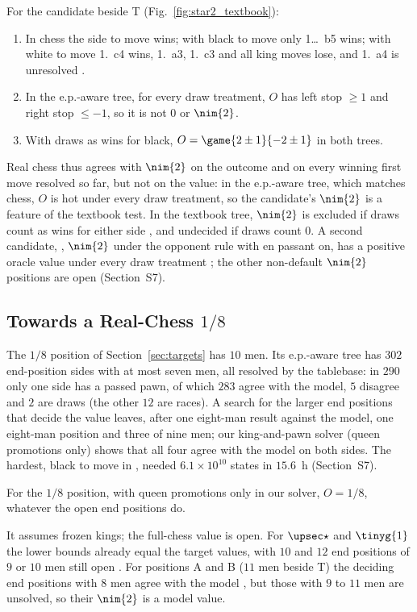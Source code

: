 \begin{theorem}\label{thm:oracle-cand}
For the candidate  beside T (Fig.~\ref{fig:star2_textbook}):
\begin{enumerate}
\item[(a)] In chess the side to move wins; with black to move only 1\ldots~b5 wins; with white to
  move 1.~c4 wins, 1.~a3, 1.~c3 and all king moves lose, and 1.~a4 is unresolved .
\item[(b)] In the e.p.-aware tree, for every draw treatment, $O$ has left stop $\ge1$ and right stop $\le-1$, so
  it is not $0$ or $\nim{2}$.
\item[(c)] With draws as wins for black, $O=\game{2\pm1}{-2\pm1}$ in both trees.
\end{enumerate}
\end{theorem}

Real chess thus agrees with $\nim{2}$ on the outcome and on every winning first move resolved so far, but not on
the value: in the e.p.-aware tree, which matches chess, $O$ is hot under every draw treatment, so the candidate's
$\nim{2}$ is a feature of the textbook test. In the textbook tree, $\nim{2}$ is excluded
if draws count as wins for either side , and undecided if draws count $0$. A second candidate, ,
$\nim{2}$ under the opponent rule with en passant on, has a positive oracle value under every draw treatment
; the other non-default $\nim{2}$ positions are open (Section~S7).

\subsection{Towards a Real-Chess \texorpdfstring{$1/8$}{1/8}}\label{sec:real-eighth}

The $1/8$ position of Section~\ref{sec:targets} has $10$ men. Its e.p.-aware tree has $302$ end-position sides
with at most seven men, all resolved by the tablebase: in $290$ only one side has a passed pawn, of which $283$
agree with the model, $5$ disagree and $2$ are draws (the other $12$ are races). A search for the larger end positions that decide the value
leaves, after one eight-man result against the model, one eight-man position and three of nine men; our
king-and-pawn solver (queen promotions only) shows that all four agree with the model on both sides. The hardest,
black to move in , needed $6.1\times10^{10}$ states in $15.6$~h (Section~S7).

\begin{proposition}\label{prop:eighth-real}
For the $1/8$ position, with queen promotions only in our solver, $O=1/8$, whatever the open end positions do.
\end{proposition}

It assumes frozen kings; the full-chess value is open. For
$\upsec\star$ and $\tinyg{1}$ the lower bounds already equal the target values, with $10$ and $12$ end positions
of $9$ or $10$ men still open . For positions A and B ($11$ men beside T) the deciding end positions with
$8$ men agree with the model , but those with $9$ to $11$ men are unsolved, so their $\nim{2}$ is a model
value.
